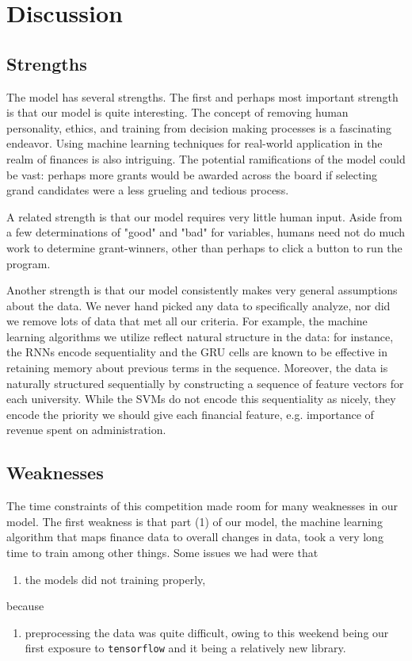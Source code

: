 \documentclass[paper.tex]{subfiles}
\begin{document}
	\section{Discussion}
	\subsection{Strengths}
	The model has several strengths. The first and perhaps most important strength is that our model is quite interesting. The concept of removing human personality, ethics, and training from decision making processes is a fascinating endeavor. Using machine learning techniques for real-world application in the realm of finances is also intriguing. The potential ramifications of the model could be vast: perhaps more grants would be awarded across the board if selecting grand candidates were a less grueling and tedious process. 
	
	A related strength is that our model requires very little human input. Aside from a few determinations of "good" and "bad" for variables, humans need not do much work to determine grant-winners, other than perhaps to click a button to run the program.
	
	Another strength is that our model consistently makes very general assumptions about the data. We never hand picked any data to specifically analyze, nor did we remove lots of data that met all our criteria. For example, the machine learning algorithms we utilize reflect natural structure in the data: for instance, the RNNs encode sequentiality and the GRU cells are known to be effective in retaining memory about previous terms in the sequence. Moreover, the data is naturally structured sequentially by constructing a sequence of feature vectors for each university. While the SVMs do not encode this sequentiality as nicely, they encode the priority we should give each financial feature, e.g. importance of revenue spent on administration.
		
	\subsection{Weaknesses}
	The time constraints of this competition made room for many weaknesses in our model. The first weakness is that part (1) of our model, the machine learning algorithm that maps finance data to overall changes in data, took a very long time to train among other things. Some issues we had were that
\begin{enumerate}
\item the models did not training properly, 
\end{enumerate}
because
\begin{enumerate}[resume]
\item preprocessing the data was quite difficult, owing to this weekend being our first exposure to \texttt{tensorflow} and it being a relatively new library.
\end{enumerate}	
\end{document}
